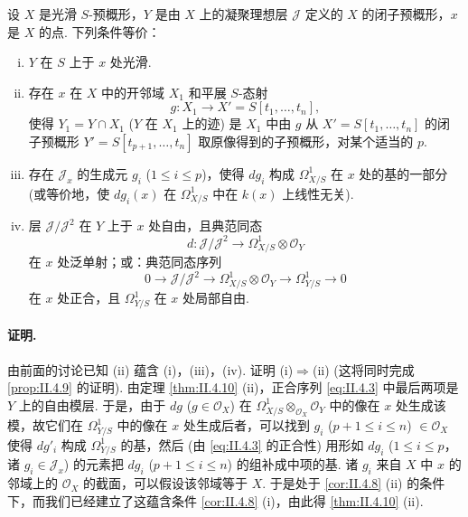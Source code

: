 \begin{theorem}\label{thm:II.4.10}
设 $X$ 是光滑 $S$-预概形，$Y$ 是由 $X$ 上的凝聚理想层 $\mathcal{J}$ 定义的 $X$ 的闭子预概形，$x$ 是 $X$ 的点. 下列条件等价：
\begin{enumerate}[(i)]
\item $Y$ 在 $S$ 上于 $x$ 处光滑.
\item 存在 $x$ 在 $X$ 中的开邻域 $X_1$ 和平展 $S$-态射
\[
g \colon X_1 \longrightarrow X' = S[t_1, \dots, t_n],
\]
使得 $Y_1 = Y \cap X_1$ ($Y$ 在 $X_1$ 上的迹) 是 $X_1$ 中由 $g$ 从 $X' = S[t_1, \dots, t_n]$ 的闭子预概形 $Y' = S[t_{p+1}, \dots, t_n]$ 取原像得到的子预概形，对某个适当的 $p$.
\item 存在 $\mathcal{J}_x$ 的生成元 $g_i$ ($1 \leqslant i \leqslant p$)，使得 $dg_i$ 构成 $\varOmega_{X/S}^{1}$ 在 $x$ 处的基的一部分 (或等价地，使 $dg_i(x)$ 在 $\varOmega_{X/S}^{1}$ 中在 $k(x)$ 上线性无关).
\item 层 $\mathcal{J}/\mathcal{J}^2$ 在 $Y$ 上于 $x$ 处自由，且典范同态
\[
d \colon \mathcal{J}/\mathcal{J}^2 \longrightarrow \varOmega_{X/S}^{1} \otimes \mathcal{O}_Y
\]
在 $x$ 处泛单射；或：典范同态序列
\[
0 \longrightarrow \mathcal{J}/\mathcal{J}^2 \longrightarrow \varOmega_{X/S}^{1} \otimes \mathcal{O}_Y \longrightarrow \varOmega_{Y/S}^{1} \longrightarrow 0
\]
在 $x$ 处正合，且 $\varOmega_{Y/S}^{1}$ 在 $x$ 处局部自由.
\end{enumerate}
\end{theorem}

\paragraph*{证明.} 由前面的讨论已知 (ii) 蕴含 (i)，(iii)，(iv). 证明 (i)$\Rightarrow$(ii) (这将同时完成 \ref{prop:II.4.9} 的证明). 由定理 \ref{thm:II.4.10} (ii)，正合序列 \eqref{eq:II.4.3} 中最后两项是 $Y$ 上的自由模层. 于是，由于 $dg$ ($g \in \mathcal{O}_X$) 在 $\varOmega_{X/S}^{1} \otimes_{\mathcal{O}_X} \mathcal{O}_Y$ 中的像在 $x$ 处生成该模，故它们在 $\varOmega_{Y/S}^{1}$ 中的像在 $x$ 处生成后者，可以找到 $g_i$ ($p+1 \leqslant i \leqslant n$) $\in \mathcal{O}_X$ 使得 $dg'_i$ 构成 $\varOmega_{Y/S}^{1}$ 的基，然后 (由 \eqref{eq:II.4.3} 的正合性) 用形如 $dg_i$ ($1 \leqslant i \leqslant p$，诸 $g_i \in \mathcal{J}_x$) 的元素把 $dg_i$ ($p+1 \leqslant i \leqslant n$) 的组补成中项的基. 诸 $g_i$ 来自 $X$ 中 $x$ 的邻域上的 $\mathcal{O}_X$ 的截面，可以假设该邻域等于 $X$. 于是处于 \ref{cor:II.4.8} (ii) 的条件下，而我们已经建立了这蕴含条件 \ref{cor:II.4.8} (i)，由此得 \ref{thm:II.4.10} (ii).


